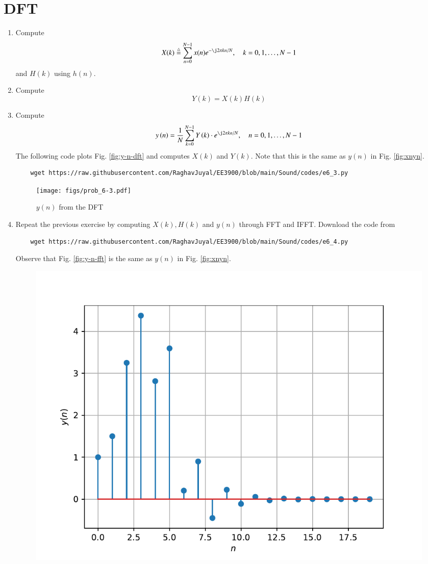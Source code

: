 \documentclass[journal,12pt,twocolumn]{IEEEtran}
\renewcommand\thesection{\arabic{section}}
\begin{document}
\section{DFT}
\begin{enumerate}[label=\thesection.\arabic*]
\item
Compute
\begin{equation}
	X(k) \define \sum _{n=0}^{N-1}x(n) e^{-\j2\pi kn/N}, \quad k = 0,1,\dots, N-1
\end{equation}
and $H(k)$ using $h(n)$.
\item Compute 
\begin{equation}
	Y(k) = X(k)H(k)
	\label{eq:fp}
\end{equation}
\item Compute
\begin{equation}
	y\brak{n}={\frac {1}{N}}\sum _{k=0}^{N-1}Y\brak{k}\cdot e^{\j 2\pi kn/N},\quad n = 0,1,\dots, N-1
	\label{eq:inv-ft}
\end{equation}
\solution The following code plots Fig. \eqref{fig:y-n-dft} and computes $X(k)$
and $Y(k)$. Note that this is the same as $y(n)$ in Fig. \eqref{fig:xnyn}.
\begin{lstlisting}
	wget https://raw.githubusercontent.com/RaghavJuyal/EE3900/blob/main/Sound/codes/e6_3.py 
\end{lstlisting}
\begin{figure}[!ht]
	\centering
	\texttt{[image: figs/prob\_6-3.pdf]}
	\caption{$y(n)$ from the DFT}
	\label{fig:y-n-dft}
\end{figure}
\item Repeat the previous exercise by computing $X(k), H(k)$ and $y(n)$ through FFT and 
IFFT.
\solution Download the code from
\begin{lstlisting}
	wget https://raw.githubusercontent.com/RaghavJuyal/EE3900/blob/main/Sound/codes/e6_4.py
\end{lstlisting}
Observe that Fig. \eqref{fig:y-n-fft} is the same as $y(n)$ in Fig. \eqref{fig:xnyn}.
\begin{figure}
	\centering
	\includegraphics[width=\columnwidth]{figs/prob_6-4.pdf}

\end{figure}
\end{enumerate}
\end{document}
